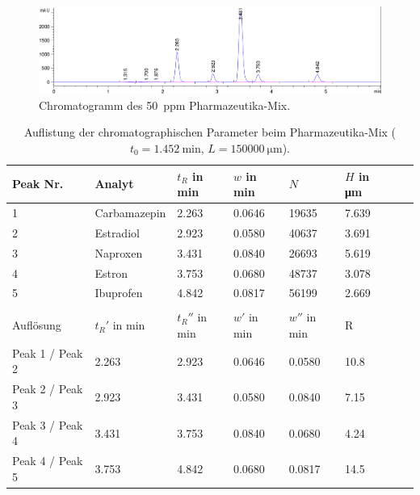     \begin{figure}[H]
      \includegraphics[scale=0.3, center]{images/Chromatogramm_PharmaMix.png} 
      \caption[Chromatogramm des Pharmazeutika-Mix, Quelle: Autor]{Chromatogramm des \SI[mode=text]{50}{ppm} Pharmazeutika-Mix.}
      \label{fig:Pharmamix}
    \end{figure}
    
    \begin{table}[H]
      \centering
      \caption[Auflistung der chromatographischen Parameter beim Pharmazeutika-Mix, Quelle: Autor]{Auflistung der chromatographischen Parameter beim Pharmazeutika-Mix ($t_0 = \SI[mode=text]{1.452}{\minute}$, $L = \SI[mode=text]{150000}{\micro\meter}$).}
      
      \label{tab:Chromatographische Parameter}
      \begin{tabular}{@{}l|lllllp{4.5cm}l@{}}
        \toprule
          Peak Nr. & Analyt & $t_R$ in \si{\minute} & $w$ in \si{\minute} & $N$ & $H$ in \si{\micro\meter} \\ \midrule
          1 & Carbamazepin & 2.263 & 0.0646 & 19635 & 7.639 \\
          2 & Estradiol & 2.923 & 0.0580 & 40637 & 3.691 \\
          3 & Naproxen & 3.431 & 0.0840 & 26693 & 5.619 \\ 
          4 & Estron & 3.753 & 0.0680 & 48737 & 3.078 \\ 
          5 & Ibuprofen & 4.842 & 0.0817 & 56199 & 2.669 \\
            &  &  &  &  &  \\ 
          Auflösung & $t_{R}'$ in \si{\minute} & $t_{R}''$ in \si{\minute} & $w'$ in \si{\minute} & $w''$ in \si{\minute} &  R \\ \midrule
          Peak 1 / Peak 2 & 2.263 & 2.923 & 0.0646 & 0.0580 & 10.8 \\
          Peak 2 / Peak 3 & 2.923 & 3.431 & 0.0580 & 0.0840 & 7.15 \\
          Peak 3 / Peak 4 & 3.431 & 3.753 & 0.0840 & 0.0680 & 4.24 \\
          Peak 4 / Peak 5 & 3.753 & 4.842 & 0.0680 & 0.0817 & 14.5 \\ \bottomrule
      \end{tabular}
    \end{table}
    

